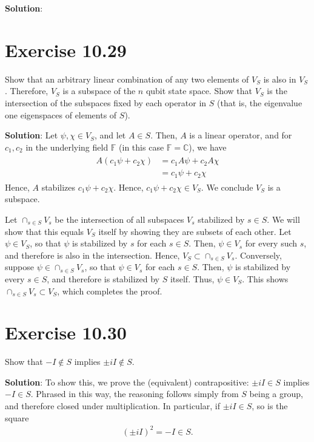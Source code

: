 \documentclass{book}
\begin{document}
    \textbf{Solution}:
    
\section*{Exercise 10.29}
    Show that an arbitrary linear combination of any two elements of $V_S$ is also in $V_S$ . Therefore, $V_S$ is a subspace of the $n$ qubit state space. Show that $V_S$ is the intersection of the subspaces fixed by each operator in $S$ (that is, the eigenvalue one eigenspaces of elements of $S$).
    
    \textbf{Solution}: Let $\psi, \chi \in V_S$, and let $A \in S$. Then, $A$ is a linear operator, and for $c_1, c_2$ in the underlying field $\mathbb{F}$ (in this case $\mathbb{F}=\mathbb{C}$), we have
    \begin{align}
    \begin{aligned}
        A\left(c_1\psi + c_2\chi\right) &= c_1 A\psi + c_2 A\chi \\
        &=c_1\psi + c_2 \chi
    \end{aligned}
    \end{align}
    Hence, $A$ stabilizes $c_1\psi + c_2\chi$. Hence, $c_1\psi + c_2 \chi\in V_S$. We conclude $V_S$ is a subspace. 
    
    Let $\cap_{s\in S} V_s$ be the intersection of all subspaces $V_s$ stabilized by $s\in S$. We will show that this equals $V_S$ itself by showing they are subsets of each other. Let $\psi \in V_S$, so that $\psi$ is stabilized by $s$ for each $s\in S$. Then, $\psi\in V_s$ for every such $s$, and therefore is also in the intersection. Hence, $V_S \subset \cap_{s\in S} V_s$. Conversely, suppose $\psi \in \cap_{s\in S} V_s$, so that $\psi\in V_s$ for each $s\in S$. Then, $\psi$ is stabilized by every $s \in S$, and therefore is stabilized by $S$ itself. Thus, $\psi \in V_S$. This shows $\cap_{s\in S} V_s \subset V_S$, which completes the proof.
    
\section*{Exercise 10.30}
    Show that $-I \notin S$ implies $\pm i I \notin S$.
    
    \textbf{Solution}: To show this, we prove the (equivalent) contrapositive: $\pm i I \in S$ implies $-I \in S$. Phrased in this way, the reasoning follows simply from $S$ being a group, and therefore closed under multiplication. In particular, if $\pm i I \in S$, so is the square
    \begin{align}
        (\pm i I)^2 = -I \in S.
    \end{align}
\end{document}

